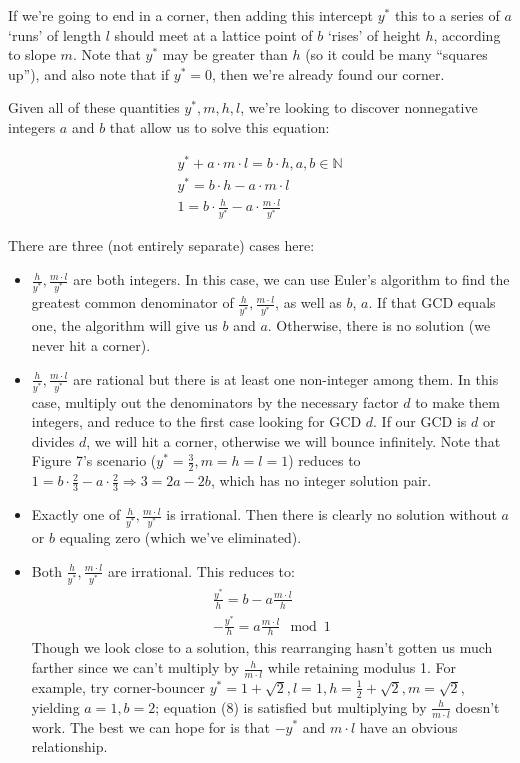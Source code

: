 \documentclass[11pt, oneside]{article} 	%
\begin{document}
If we're going to end in a corner, then adding this intercept $y^*$ this to a series of $a$ `runs' of length $l$ should meet at a lattice point of $b$ `rises' of height $h$, according to slope $m$.  Note that $y^*$ may be greater than $h$ (so it could be many ``squares up''), and also note that if $y^* = 0$, then we're already found our corner.  

Given all of these quantities $y^*, m, h, l$, we're looking to discover nonnegative integers $a$ and $b$ that allow us to solve this equation:

\begin{align}
y^* + a\cdot m \cdot l = b \cdot h, a, b \in \mathbb{N} \\ 
y^* = b \cdot h -  a\cdot m \cdot l \\
1 = b \cdot \frac{h}{y^*} -  a\cdot \frac{m \cdot l}{y^*} 
\end{align}

There are three (not entirely separate) cases here:

\begin{itemize}
\item $\frac{h}{y^*}, \frac{m \cdot l}{y^*}$ are both integers. In this case, we can use Euler's algorithm to find the greatest common denominator of $\frac{h}{y^*}, \frac{m \cdot l}{y^*}$, as well as $b$, $a$.  If that GCD equals one, the algorithm will give us $b$ and $a$.  Otherwise, there is no solution (we never hit a corner).
\item $\frac{h}{y^*}, \frac{m \cdot l}{y^*}$ are rational but there is at least one non-integer among them.  In this case, multiply out the denominators by the necessary factor $d$ to make them integers, and reduce to the first case looking for GCD $d$.  If our GCD is $d$ or divides $d$, we will hit a corner, otherwise we will bounce infinitely.  Note that Figure 7's scenario ($y^* = \frac{3}{2}, m = h = l = 1$) reduces to $1 = b \cdot \frac{2}{3} - a  \cdot \frac{2}{3} \Rightarrow 3 = 2a-2b$, which has no integer solution pair.
\item Exactly one of $\frac{h}{y^*}, \frac{m \cdot l}{y^*}$ is irrational.  Then there is clearly no solution without $a$ or $b$ equaling zero (which we've eliminated).
\item Both $\frac{h}{y^*}, \frac{m \cdot l}{y^*}$ are irrational.  This reduces to:
\begin{align}
\frac{y^*}{h} = b - a\frac{m \cdot l}{h} \\
-\frac{y^*}{h} = a\frac{m \cdot l}{h} \mod 1 
\end{align}
Though we look close to a solution, this rearranging hasn't gotten us much farther since we can't multiply by $\frac{h}{m \cdot l}$ while retaining modulus 1.  For example, try corner-bouncer $y^* = 1+\sqrt{2}, l = 1, h = \frac{1}{2} + \sqrt{2}, m = \sqrt{2}$, yielding $a = 1, b = 2$; equation (8) is satisfied but multiplying by $\frac{h}{m \cdot l}$ doesn't work.  The best we can hope for is that $-y^*$ and $m \cdot l$ have an obvious relationship.

\end{itemize}
\end{document}
